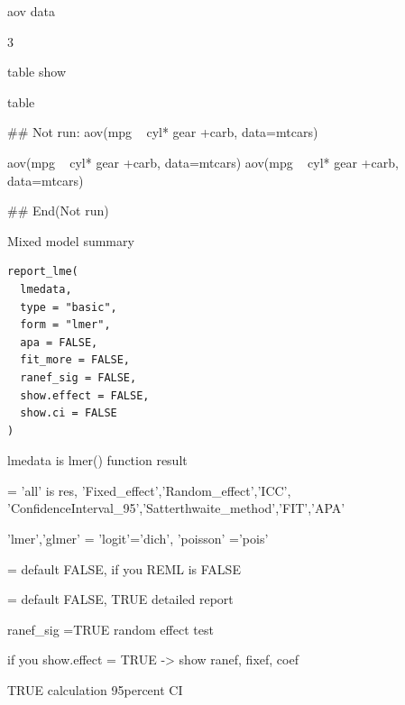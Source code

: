 \documentclass[a4paper]{book}
\begin{document}
%
\begin{Arguments}
\begin{ldescription}
\item[\code{data}] aov data

\item[\code{digits}] 3

\item[\code{print}] table show
\end{ldescription}
\end{Arguments}
%
\begin{Value}
table
\end{Value}
%
\begin{Examples}
\begin{ExampleCode}

\#\# Not run: 
aov(mpg ~ cyl* gear +carb, data=mtcars) %

aov(mpg ~ cyl* gear +carb, data=mtcars) %
aov(mpg ~ cyl* gear +carb, data=mtcars) %


## End(Not run)

\end{ExampleCode}
\end{Examples}
%
\begin{Description}
Mixed model summary
\end{Description}
%
\begin{Usage}
\begin{verbatim}
report_lme(
  lmedata,
  type = "basic",
  form = "lmer",
  apa = FALSE,
  fit_more = FALSE,
  ranef_sig = FALSE,
  show.effect = FALSE,
  show.ci = FALSE
)
\end{verbatim}
\end{Usage}
%
\begin{Arguments}
\begin{ldescription}
\item[\code{lmedata}] lmedata is lmer() function result

\item[\code{type}] = 'all' is res, 'Fixed\_effect','Random\_effect','ICC', 'ConfidenceInterval\_95','Satterthwaite\_method','FIT','APA'

\item[\code{form}] 'lmer','glmer' = 'logit'='dich', 'poisson' ='pois'

\item[\code{apa}] = default FALSE, if you  REML is FALSE

\item[\code{fit\_more}] = default FALSE, TRUE detailed report

\item[\code{ranef\_sig}] ranef\_sig =TRUE  random effect test

\item[\code{show.effect}] if you show.effect = TRUE -> show ranef, fixef, coef

\item[\code{show.ci}] TRUE calculation 95percent CI
\end{ldescription}
\end{Arguments}
\end{document}

